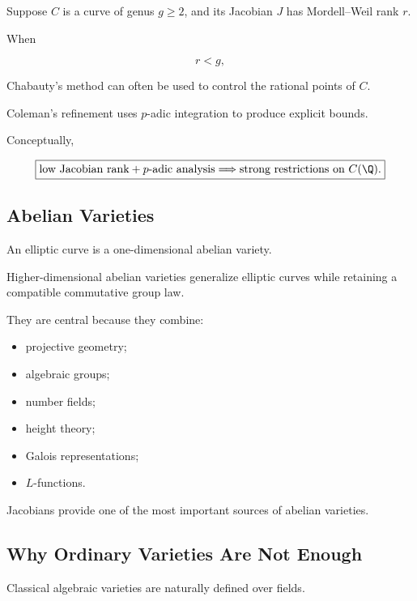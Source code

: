 Suppose \(C\) is a curve of genus \(g\geq2\), and its Jacobian \(J\) has
Mordell--Weil rank \(r\).

When

\[ r<g, \]

Chabauty's method can often be used to control the rational points of \(C\).

Coleman's refinement uses \(p\)-adic integration to produce explicit bounds.

Conceptually,

\[
\boxed{
\text{low Jacobian rank}
+
\text{\(p\)-adic analysis}
\Longrightarrow
\text{strong restrictions on }C(\Q).
}
\]

\subsection{Abelian Varieties}
\label{subsec:abelian-varieties-arithmetic-geometry}

An elliptic curve is a one-dimensional abelian variety.

Higher-dimensional abelian varieties generalize elliptic curves while
retaining a compatible commutative group law.

They are central because they combine:

\begin{itemize}
    \item projective geometry;
    \item algebraic groups;
    \item number fields;
    \item height theory;
    \item Galois representations;
    \item \(L\)-functions.
\end{itemize}

Jacobians provide one of the most important sources of abelian varieties.

\subsection{Why Ordinary Varieties Are Not Enough}
\label{subsec:why-schemes-arithmetic}

Classical algebraic varieties are naturally defined over fields.

